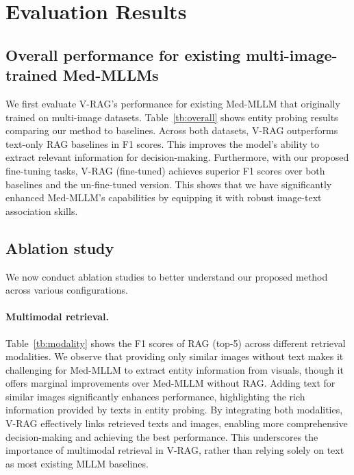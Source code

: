 \section{Evaluation Results}


\subsection{Overall performance for existing multi-image-trained Med-MLLMs}
We first evaluate V-RAG's performance for existing Med-MLLM that originally trained on multi-image datasets. Table~\ref{tb:overall} shows entity probing results comparing our method to baselines.
Across both datasets, V-RAG outperforms text-only RAG baselines in F1 scores. This improves the model's ability to extract relevant information for decision-making. Furthermore, with our proposed fine-tuning tasks, V-RAG (fine-tuned) achieves superior F1 scores over both baselines and the un-fine-tuned version. This shows that we have significantly enhanced Med-MLLM's capabilities by equipping it with robust image-text association skills.




\subsection{Ablation study}
We now conduct ablation studies to better understand our proposed method across various configurations.

\paragraph{Multimodal retrieval.} 
Table~\ref{tb:modality} shows the F1 scores of RAG (top-5) across different retrieval modalities. We observe that providing only similar images without text makes it challenging for Med-MLLM to extract entity information from visuals, though it offers marginal improvements over Med-MLLM without RAG. Adding text for similar images significantly enhances performance, highlighting the rich information provided by texts in entity probing.
By integrating both modalities, V-RAG effectively links retrieved texts and images, enabling more comprehensive decision-making and achieving the best performance. This underscores the importance of multimodal retrieval in V-RAG, rather than relying solely on text as most existing MLLM baselines.




